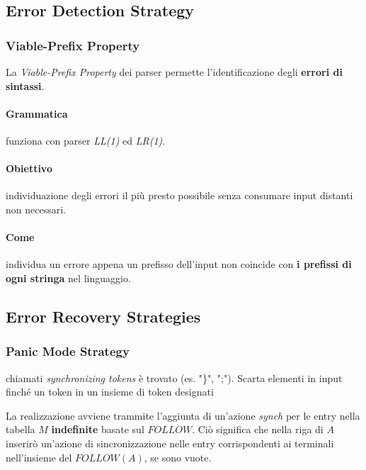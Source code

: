 \subsection{Error Detection Strategy}
\subsubsection{Viable-Prefix Property}
La \textit{Viable-Prefix Property} dei parser permette l'identificazione degli
\textbf{errori di sintassi}.

\paragraph{Grammatica}
funziona con parser \textit{LL(1)} ed \textit{LR(1)}.
\paragraph{Obiettivo}
individuazione degli errori il pi\`u presto possibile senza consumare input
distanti non necessari.
\paragraph{Come}
individua un errore appena un prefisso dell'input non coincide con \textbf{i
prefissi di ogni stringa} nel linguaggio.

\subsection{Error Recovery Strategies}
\subsubsection{Panic Mode Strategy}
chiamati \textit{synchronizing tokens} \`e trovato (es. "\}", ";").
Scarta elementi in input finch\'e un token in un insieme di token designati

La realizzazione avviene trammite l'aggiunta di un'azione \textit{synch} per
le entry nella tabella $M$ \textbf{indefinite} basate sul $FOLLOW$. Ci\`o
significa che nella riga di $A$ inserir\`o un'azione di sincronizzazione nelle
entry corrispondenti ai terminali nell'insieme del $FOLLOW(A)$, se sono vuote.

